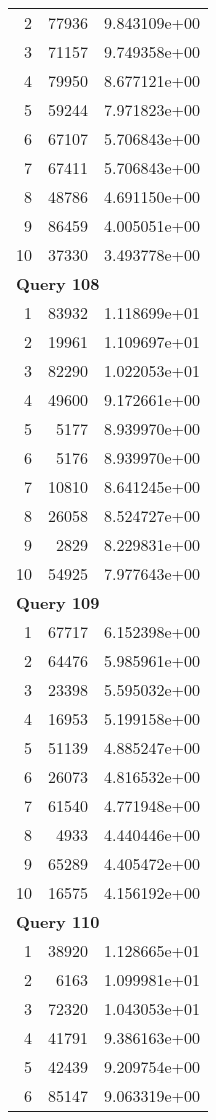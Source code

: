\begin{longtable}[{p}]{@{}rrp{}@{}}
2 & 77936 & 9.843109e+00 \\
3 & 71157 & 9.749358e+00 \\
4 & 79950 & 8.677121e+00 \\
5 & 59244 & 7.971823e+00 \\
6 & 67107 & 5.706843e+00 \\
7 & 67411 & 5.706843e+00 \\
8 & 48786 & 4.691150e+00 \\
9 & 86459 & 4.005051e+00 \\
10 & 37330 & 3.493778e+00 \\
\midrule
\multicolumn{3}{l}{\bfseries Query 108} \\
1 & 83932 & 1.118699e+01 \\
2 & 19961 & 1.109697e+01 \\
3 & 82290 & 1.022053e+01 \\
4 & 49600 & 9.172661e+00 \\
5 & 5177 & 8.939970e+00 \\
6 & 5176 & 8.939970e+00 \\
7 & 10810 & 8.641245e+00 \\
8 & 26058 & 8.524727e+00 \\
9 & 2829 & 8.229831e+00 \\
10 & 54925 & 7.977643e+00 \\
\midrule
\multicolumn{3}{l}{\bfseries Query 109} \\
1 & 67717 & 6.152398e+00 \\
2 & 64476 & 5.985961e+00 \\
3 & 23398 & 5.595032e+00 \\
4 & 16953 & 5.199158e+00 \\
5 & 51139 & 4.885247e+00 \\
6 & 26073 & 4.816532e+00 \\
7 & 61540 & 4.771948e+00 \\
8 & 4933 & 4.440446e+00 \\
9 & 65289 & 4.405472e+00 \\
10 & 16575 & 4.156192e+00 \\
\midrule
\multicolumn{3}{l}{\bfseries Query 110} \\
1 & 38920 & 1.128665e+01 \\
2 & 6163 & 1.099981e+01 \\
3 & 72320 & 1.043053e+01 \\
4 & 41791 & 9.386163e+00 \\
5 & 42439 & 9.209754e+00 \\
6 & 85147 & 9.063319e+00 \\

\end{longtable}
